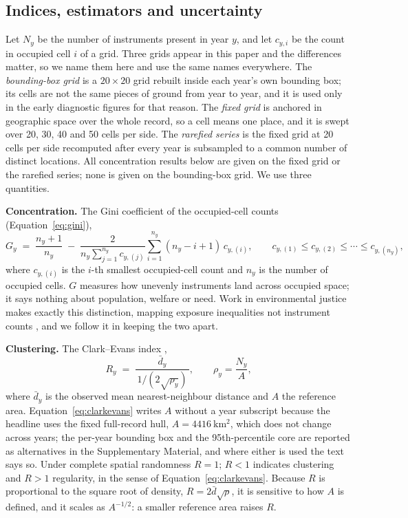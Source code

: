 \documentclass{article}
\begin{document}
\subsection{Indices, estimators and uncertainty}
\label{sec:indices}

Let $N_y$ be the number of instruments present in year $y$, and let $c_{y,i}$ be the
count in occupied cell $i$ of a grid. Three grids appear in this paper and the differences
matter, so we name them here and use the same names everywhere. The \emph{bounding-box
grid} is a $20\times20$ grid rebuilt inside each year's own bounding box; its cells are not
the same pieces of ground from year to year, and it is used only in the early diagnostic
figures for that reason. The \emph{fixed grid} is anchored in geographic space over the
whole record, so a cell means one place, and it is swept over 20, 30, 40 and 50 cells per
side. The \emph{rarefied series} is the fixed grid at 20 cells per side recomputed after
every year is subsampled to a common number of distinct locations. All concentration
results below are given on the fixed grid or the rarefied series; none is given on the
bounding-box grid. We use three quantities.

\noindent\textbf{Concentration.} The Gini coefficient \cite{gini1921measurement} of the
occupied-cell counts (Equation~\eqref{eq:gini}),
\begin{equation}
G_y \;=\; \frac{n_y+1}{n_y} \;-\; \frac{2}{n_y \sum_{j=1}^{n_y} c_{y,(j)}} \sum_{i=1}^{n_y} (n_y - i + 1)\, c_{y,(i)},
\qquad c_{y,(1)} \le c_{y,(2)} \le \cdots \le c_{y,(n_y)},
\label{eq:gini}
\end{equation}
where $c_{y,(i)}$ is the $i$-th smallest occupied-cell count and $n_y$ is the number of
occupied cells. $G$ measures how unevenly instruments land across occupied space; it
says nothing about population, welfare or need. Work
in environmental justice makes exactly this distinction, mapping exposure inequalities
not instrument counts
\cite{jiang2025environmental,alegria2024framework,karasaki2026geospatial}, and we follow
it in keeping the two apart.

\noindent\textbf{Clustering.} The Clark--Evans index \cite{clark1954distance},
\begin{equation}
R_y \;=\; \frac{\bar{d}_y}{\,1/(2\sqrt{\rho_y})\,},
\qquad
\rho_y = \frac{N_y}{A},
\label{eq:clarkevans}
\end{equation}
where $\bar{d}_y$ is the observed mean nearest-neighbour distance and $A$ the reference area.
Equation~\eqref{eq:clarkevans} writes $A$ without a year subscript because the headline uses the
fixed full-record hull, $A = \SI{4416}{\kilo\meter\squared}$, which does not change across years;
the per-year bounding box and the 95th-percentile core are reported as alternatives in
the Supplementary Material, and where either is used the text says so. Under complete spatial randomness
$R = 1$; $R < 1$ indicates
clustering and $R > 1$ regularity, in the sense of Equation~\eqref{eq:clarkevans}. Because $R$ is proportional to the square
root of density, $R = 2\bar{d}\sqrt{\rho}$, it is sensitive to how $A$ is defined, and it scales as $A^{-1/2}$: a smaller
reference area raises $R$.
\end{document}
